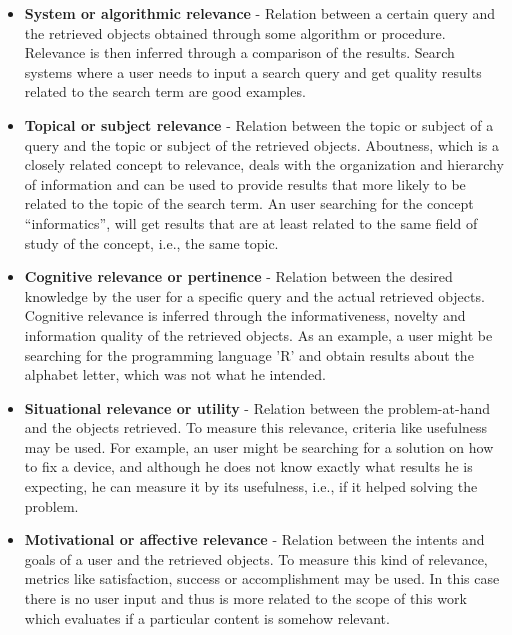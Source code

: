 \begin{itemize}
	\item \textbf{System or algorithmic relevance} - Relation between a certain query and the retrieved objects obtained through some algorithm or procedure. Relevance is then inferred through a comparison of the results. Search systems where a user needs to input a search query and get quality results related to the search term are good examples. 
    \item \textbf{Topical or subject relevance} - Relation between the topic or subject of a query and the topic or subject of the retrieved objects. Aboutness, which is a closely related concept to relevance, deals with the organization and hierarchy of information and can be used to provide results that more likely to be related to the topic of the search term. An user searching for the concept ``informatics'', will get results that are at least related to the same field of study of the concept, i.e., the same topic. 
    \item \textbf{Cognitive relevance or pertinence} - Relation between the desired knowledge by the user for a specific query and the actual retrieved objects. Cognitive relevance is inferred through the informativeness, novelty and information quality of the retrieved objects. As an example, a user might be searching for the programming language 'R' and obtain results about the alphabet letter, which was not what he intended.
    \item \textbf{Situational relevance or utility} - Relation between the problem-at-hand and the objects retrieved. To measure this relevance, criteria like usefulness may be used. For example, an user might be searching for a solution on how to fix a device, and although he does not know exactly what results he is expecting, he can measure it by its usefulness, i.e., if it helped solving the problem. 
    \item \textbf{Motivational or affective relevance} - Relation between the intents and goals of a user and the retrieved objects. To measure this kind of relevance, metrics like satisfaction, success or accomplishment may be used. In this case there is no user input and thus is more related to the scope of this work which evaluates if a particular content is somehow relevant.
\end{itemize}


